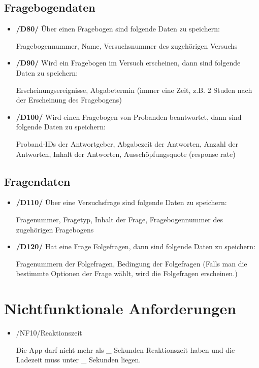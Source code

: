\documentclass[a4paper]{scrreprt}
\begin{document}
        \section{Fragebogendaten}
            \begin{itemize}
                \item \textbf{/D80/} Über einen Fragebogen sind folgende Daten zu speichern:
                \par Fragebogennummer, Name, Versuchsnummer des zugehörigen Versuchs
                
                \item \textbf{/D90/} Wird ein Fragebogen im Versuch erscheinen, dann sind folgende Daten zu speichern:
                \par Erscheinungsereignisse, Abgabetermin (immer eine Zeit, z.B. 2 Studen nach der Erscheinung des Fragebogens)
                
                \item \textbf{/D100/} Wird einen Fragebogen von \gls{Proband}en beantwortet, dann sind folgende Daten zu speichern:
                \par \gls{Proband}-IDs der Antwortgeber, Abgabezeit der Antworten, Anzahl der Antworten, Inhalt der Antworten, Ausschöpfungsquote (response rate)
            \end{itemize}
            
        \section{Fragendaten}
            \begin{itemize}
                \item \textbf{/D110/} Über eine Versuchsfrage sind folgende Daten zu speichern:
                    \par Fragenummer, Fragetyp, Inhalt der Frage, Fragebogennummer des zugehörigen Fragebogens

                \item \textbf{/D120/} Hat eine Frage Folgefragen, dann sind folgende Daten zu speichern:
                    \par Fragenummern der Folgefragen, Bedingung der Folgefragen (Falls man die bestimmte Optionen der Frage wählt, wird die Folgefragen erscheinen.)
            \end{itemize}

   \chapter{Nichtfunktionale Anforderungen}
        \begin{itemize}
            \item /NF10/Reaktionszeit

                \par Die App darf nicht mehr als \_ Sekunden Reaktionszeit haben und die Ladezeit muss unter \_ Sekunden liegen.


        \end{itemize}
\end{document}
